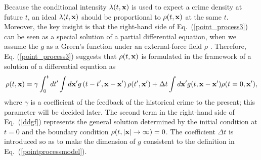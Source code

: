 \documentclass[review]{elsarticle}
\newcommand{\bv}[1]{{\bf #1}}
\newcommand{\lr}[1]{\left(#1\right)}
\begin{document}
Because the conditional intensity $\lambda(t,\bv{x})$ is used to expect a 
crime density at future $t$,
an ideal $\lambda(t,\bv{x})$ should be proportional to 
$\rho(t,\bv{x})$ at the same $t$.
Moreover, the key insight is that
 the right-hand side of Eq.~(\ref{point_process3}) can be seen
as a special solution of a partial differential equation,
when we assume the $g$ as a Green's function
under an external-force field $\rho$ \cite{stanley}.
Therefore, Eq. (\ref{point_process3}) suggests that
$\rho(t,\bv{x})$ is formulated in the framework of a solution of
a differential equation as
\begin{eqnarray}
  \rho(t,\bv{x}) =
  \gamma \int_0^t dt' \int d\bv{x}' g\lr{t-t',\bv{x}-\bv{x}'}   \rho(t',\bv{x}')
  + \Delta t \int d\bv{x}' g(t,\bv{x}-\bv{x}')  \rho(t=0,\bv{x}'),
\label{ddgf}
\end{eqnarray}
where $\gamma$ is a coefficient of the feedback of the historical crime to the present; this parameter will be decided later.
The second term in the right-hand side of Eq.~(\ref{ddgf}) represents the general solution determined by
the initial condition at $t=0$
and
the boundary condition $\rho(t, |\bv{x}| \to \infty) = 0$.
The coefficient $\Delta t$ is introduced so as to make the dimension of $g$ consistent to the definition in
Eq.~(\ref{pointprocessmodel}).

\end{document}
